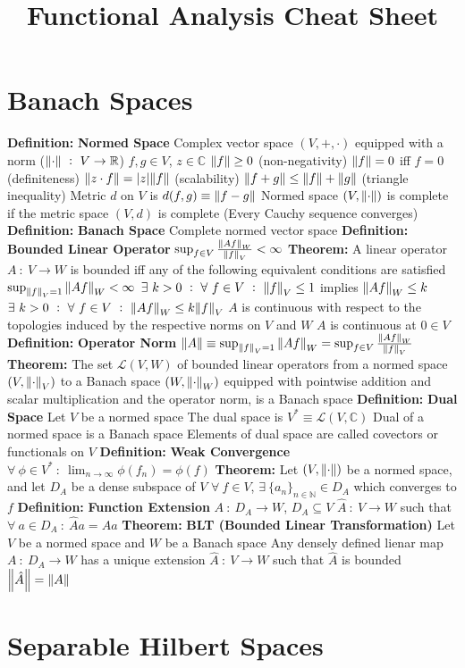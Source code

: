 \documentclass[14pt]{extarticle}
\title{Functional Analysis Cheat Sheet}
\def\Definition{{\color{blue} \textbf{Definition:} }}
\def\Theorem{{\color{red} \textbf{Theorem:} }}
\begin{document}
	\maketitle
	
	\section*{Banach Spaces}
	\begin{outline}		
		\1	\Definition \textbf{Normed Space}
			\2	Complex vector space $(V,+,\cdot)$ equipped with a norm
					($\norm{\cdot}~:~V \rightarrow \mathbb{R}$)
				\3	$f,g \in V$, $z \in \mathbb{C}$	
				\3	$\norm{f} \ge 0$ (non-negativity)
				\3	$\norm{f} = 0$ iff $f = 0$ (definiteness)
				\3	$\norm{z \cdot f} = \abs{z}\norm{f}$ (scalability)
				\3	$\norm{f + g} \le \norm{f} + \norm{g}$ (triangle inequality)
			\2	Metric $d$ on $V$ is $d(f,g) \equiv \norm{f - g}$
			\2	Normed space $(V,\norm{\cdot})$ is complete if the metric space
					$(V,d)$ is complete (Every Cauchy sequence converges)
		\1	\Definition \textbf{Banach Space}
			\2	Complete normed vector space
		\1	\Definition \textbf{Bounded Linear Operator}
			\2	$\sup_{f \in V} \frac{\norm{Af}_W}{\norm{f}_V} < \infty$
		\1	\Theorem A linear operator $A~:~V \rightarrow W$ is bounded iff any of
				the following equivalent conditions are satisfied
			\2	$\sup_{\norm{f}_V = 1}\norm{Af}_W < \infty$
			\2	$\exists~k > 0~:~\forall~f \in V~:~\norm{f}_V \le 1$ implies $\norm{Af}_W \le k$
			\2	$\exists~k > 0~:~\forall~f \in V~:~\norm{Af}_W \le k\norm{f}_V$
			\2	$A$ is continuous with respect to the topologies induced by the
					respective norms on $V$ and $W$
			\2	$A$ is continuous at $0 \in V$
		\1	\Definition \textbf{Operator Norm}
			\2	$\norm{A} \equiv \sup_{\norm{f}_V = 1} \norm{Af}_W = 
					\sup_{f \in V}\frac{\norm{Af}_W}{\norm{f}_V}$
		\1	\Theorem The set $\mathcal{L}(V,W)$ of bounded linear operators from
				a normed space $(V,\norm{\cdot}_V)$ to a Banach space $(W,\norm{\cdot}_W)$
				equipped with pointwise addition and scalar multiplication and the operator
				norm, is a Banach space
		\1	\Definition \textbf{Dual Space}
			\2	Let $V$ be a normed space
			\2	The dual space is $V^* \equiv \mathcal{L}(V,\mathbb{C})$
			\2	Dual of a normed space is a Banach space
			\2	Elements of dual space are called covectors or functionals on $V$
		\1	\Definition \textbf{Weak Convergence}
			\2	$\forall~\phi \in V^*~:~\lim_{n \rightarrow \infty} \phi(f_n) = \phi(f)$
		\1	\Theorem 
			\2	Let $(V,\norm{\cdot})$ be a normed space, and let $D_A$ be a dense
					subspace of $V$
			\2	$\forall~f \in V$, $\exists~\{a_n\}_{n \in \mathbb{N}} \in D_A$ which
					converges to $f$
		\1	\Definition \textbf{Function Extension}
			\2	$A~:~D_A \rightarrow W$, $D_A \subseteq V$
			\2	$\hat{A}~:~V \rightarrow W$ such that
					$\forall~a \in D_A~:~\hat{A}a = Aa$
		\1	\Theorem \textbf{BLT (Bounded Linear Transformation)}
			\2	Let $V$ be a normed space and $W$ be a Banach space
			\2	Any densely defined lienar map $A~:~D_A \rightarrow W$ has a unique
					extension $\hat{A}~:~V \rightarrow W$ such that $\hat{A}$ is bounded
			\2	$\norm{\hat{A}} = \norm{A}$
	
	\section*{Separable Hilbert Spaces}
	\end{outline}
\end{document}
